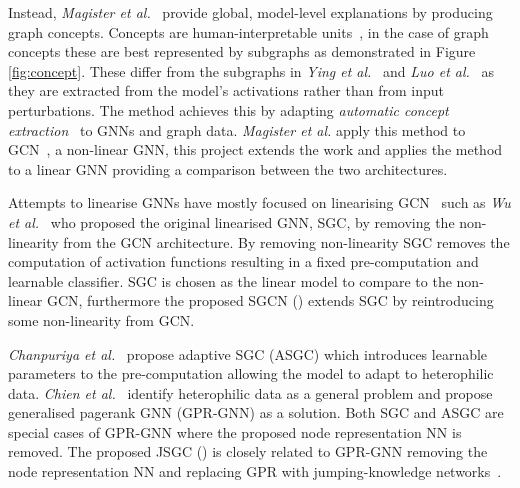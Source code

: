 Instead, \textit{Magister et al.}~\cite{magister2021gcexplainer} provide global, model-level explanations by producing graph concepts.
Concepts are human-interpretable units~\cite{ghorbani2019towards}, in the case of graph concepts these are best represented by subgraphs as demonstrated in Figure \ref{fig:concept}.
These differ from the subgraphs in \textit{Ying et al.}~\cite{ying2019gnnexplainer} and \textit{Luo et al.}~\cite{luo2020parameterized} as they are extracted from the model's activations rather than from input perturbations.
The method achieves this by adapting \textit{automatic concept extraction}~\cite{ghorbani2019towards} to GNNs and graph data.
\textit{Magister et al.} apply this method to GCN~\cite{kipf2016semi}, a non-linear GNN, this project extends the work and applies the method to a linear GNN providing a comparison between the two architectures.

Attempts to linearise GNNs have mostly focused on linearising GCN~\cite{kipf2016semi} such as \textit{Wu et al.}~\cite{wu2019simplifying} who proposed the original linearised GNN, SGC, by removing the non-linearity from the GCN architecture.
By removing non-linearity SGC removes the computation of activation functions resulting in a fixed pre-computation and learnable classifier.
SGC is chosen as the linear model to compare to the non-linear GCN, furthermore the proposed SGCN () extends SGC by reintroducing some non-linearity from GCN.

\textit{Chanpuriya et al.}~\cite{chanpuriya2022simplified} propose adaptive SGC (ASGC) which introduces learnable parameters to the pre-computation allowing the model to adapt to heterophilic data.
\textit{Chien et al.}~\cite{chien2020adaptive} identify heterophilic data as a general problem and propose generalised pagerank GNN (GPR-GNN) as a solution.
Both SGC and ASGC are special cases of GPR-GNN where the proposed node representation NN is removed.
The proposed JSGC () is closely related to GPR-GNN removing the node representation NN and replacing GPR with jumping-knowledge networks~\cite{xu2018representation}.

